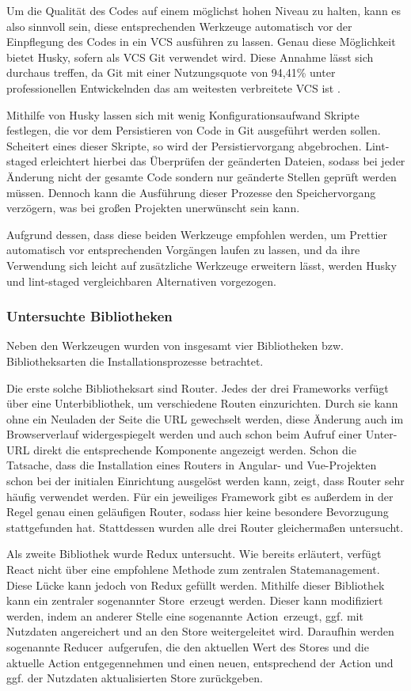 Um die Qualität des Codes auf einem möglichst hohen Niveau zu halten, kann es also sinnvoll sein, diese entsprechenden Werkzeuge automatisch vor der Einpflegung des Codes in ein \gls{VCS} ausführen zu lassen. Genau diese Möglichkeit bietet Husky, sofern als \gls{VCS} Git verwendet wird. Diese Annahme lässt sich durchaus treffen, da Git mit einer Nutzungsquote von 94,41\% unter professionellen Entwickelnden das am weitesten verbreitete \gls{VCS} ist \cite{git_usage}.

Mithilfe von Husky lassen sich mit wenig Konfigurationsaufwand Skripte festlegen, die vor dem Persistieren von Code in Git ausgeführt werden sollen. Scheitert eines dieser Skripte, so wird der Persistiervorgang abgebrochen. Lint-staged erleichtert hierbei das Überprüfen der geänderten Dateien, sodass bei jeder Änderung nicht der gesamte Code sondern nur geänderte Stellen geprüft werden müssen. Dennoch kann die Ausführung dieser Prozesse den Speichervorgang verzögern, was bei großen Projekten unerwünscht sein kann.

Aufgrund dessen, dass diese beiden Werkzeuge empfohlen werden, um Prettier automatisch vor entsprechenden Vorgängen laufen zu lassen, und da ihre Verwendung sich leicht auf zusätzliche Werkzeuge erweitern lässt, werden Husky und lint-staged vergleichbaren Alternativen vorgezogen.

\subsubsection{Untersuchte Bibliotheken}
Neben den Werkzeugen wurden von insgesamt vier Bibliotheken bzw. Bibliotheksarten die Installationsprozesse betrachtet.

Die erste solche Bibliotheksart sind Router. Jedes der drei Frameworks verfügt über eine Unterbibliothek, um verschiedene Routen einzurichten. Durch sie kann ohne ein Neuladen der Seite die URL gewechselt werden, diese Änderung auch im Browserverlauf widergespiegelt werden und auch schon beim Aufruf einer Unter-URL direkt die entsprechende Komponente angezeigt werden. Schon die Tatsache, dass die Installation eines Routers in Angular- und Vue-Projekten schon bei der initialen Einrichtung ausgelöst werden kann, zeigt, dass Router sehr häufig verwendet werden. Für ein jeweiliges Framework gibt es außerdem in der Regel genau einen geläufigen Router, sodass hier keine besondere Bevorzugung stattgefunden hat. Stattdessen wurden alle drei Router gleichermaßen untersucht.

Als zweite Bibliothek wurde Redux untersucht. Wie bereits erläutert, verfügt React nicht über eine empfohlene Methode zum zentralen Statemanagement. Diese Lücke kann jedoch von Redux gefüllt werden. Mithilfe dieser Bibliothek kann ein zentraler sogenannter \glqq Store\grqq\ erzeugt werden. Dieser kann modifiziert werden, indem an anderer Stelle eine sogenannte \glqq Action\grqq\ erzeugt, ggf. mit Nutzdaten angereichert und an den Store weitergeleitet wird. Daraufhin werden sogenannte \glqq Reducer\grqq\ aufgerufen, die den aktuellen Wert des Stores und die aktuelle Action entgegennehmen und einen neuen, entsprechend der Action und ggf. der Nutzdaten aktualisierten Store zurückgeben.


